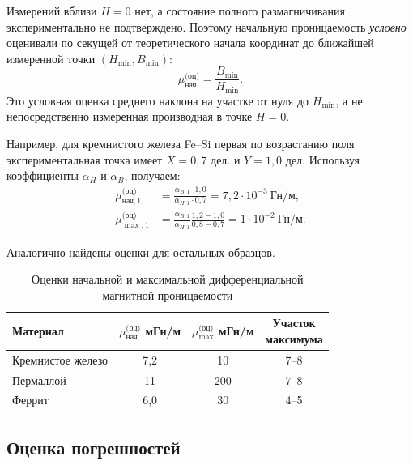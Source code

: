 \documentclass[12pt,a4paper]{article}
\begin{document}
Измерений вблизи $H=0$ нет, а состояние полного размагничивания
экспериментально не подтверждено. Поэтому начальную проницаемость
\emph{условно} оценивали по секущей от теоретического начала
координат до ближайшей измеренной точки $(H_{\min},B_{\min})$:
\begin{equation}
  \mu_{\text{нач}}^{\text{(оц)}}=
  \frac{B_{\min}}{H_{\min}}.
  \label{eq:mu_initial}
\end{equation}
Это условная оценка среднего наклона на участке от нуля до
$H_{\min}$, а не непосредственно измеренная производная
в точке $H=0$.

Например, для кремнистого железа Fe--Si первая по возрастанию поля
экспериментальная точка имеет $X=0{,}7$ дел. и $Y=1{,}0$ дел.
Используя коэффициенты $\alpha_H$ и $\alpha_B$,
получаем:
\begin{align*}
  \mu_{\text{нач},1}^{\text{(оц)}}
  &=\frac{\alpha_{B,1}\cdot1{,}0}{\alpha_{H,1}\cdot0{,}7}
    =7{,}2\cdot10^{-3}\ \text{Гн/м},\\
  \mu_{\max,1}^{\text{(оц)}}
  &=\frac{\alpha_{B,1}}{\alpha_{H,1}}
    \frac{1{,}2-1{,}0}{0{,}8-0{,}7}
    =1\cdot10^{-2}\ \text{Гн/м}.
\end{align*}

Аналогично найдены оценки для остальных образцов.
\begin{table}[H]
  \centering
  \caption{Оценки начальной и максимальной дифференциальной магнитной проницаемости}
  \label{tab:mu_results}
  \small
  \setlength{\tabcolsep}{5pt}
  \begin{tabular}{l c c c}
    \toprule
    Материал & \shortstack{$\mu_{\text{нач}}^{\text{(оц)}}$\\мГн/м} &
    \shortstack{$\mu_{\max}^{\text{(оц)}}$\\мГн/м} &
    \shortstack{Участок\\максимума} \\
    \midrule
    Кремнистое железо & 7,2 & 10 & 7--8 \\
    Пермаллой & 11 & 200 & 7--8 \\
    Феррит & 6,0 & 30 & 4--5 \\
    \bottomrule
  \end{tabular}
\end{table}

\clearpage

\subsection{Оценка погрешностей}
\end{document}
